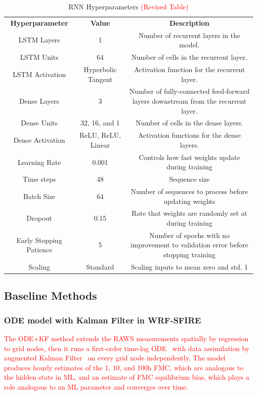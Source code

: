 \documentclass[fire,article,submit,pdftex,moreauthors]{Definitions/mdpi}
\begin{document}
\begin{table}[tbh]
\small
\caption{RNN Hyperparameters \textcolor{red}{(Revised Table)}\label{tab:rnn_params}}
\begin{tabularx}{\textwidth}{CCC}
\toprule
\textbf{Hyperparameter} & \textbf{Value} & \textbf{Description} \\
LSTM Layers & 1 & Number of recurrent layers in the model.\\
\midrule
LSTM Units & 64 & Number of cells in the recurrent layer.\\
\midrule
LSTM Activation & Hyperbolic Tangent & Activation function for the recurrent layer.\\
\midrule
Dense Layers & 3 & Number of fully-connected feed-forward layers downstream from the recurrent layer.\\
\midrule
Dense Units & 32, 16, and 1 & Number of cells in the dense layers.\\
\midrule
Dense Activation & ReLU, ReLU, Linear & Activation functions for the dense layers.\\
\midrule
Learning Rate & 0.001 & Controls how fast weights update during training \\
\midrule
Time steps & 48 & 
Sequence size\\
\midrule
Batch Size & 64 & Number of sequences to process before updating weights \\
\midrule
Dropout & 0.15 & Rate that weights are randomly set at during training \\
\midrule
Early Stopping Patience & 5 & Number of epochs with no improvement to validation error before stopping training \\
\midrule
Scaling & Standard & Scaling inputs to mean zero and std. 1 \\
\bottomrule
\end{tabularx}
\end{table}

\subsection{Baseline Methods}
\label{subsec:baseline}

\subsubsection{ODE model with Kalman Filter in WRF-SFIRE}
\label{sec:ODE_KF}

\textcolor{red}{The ODE+KF method extends the RAWS measurements spatially by regression to grid nodes, then it runs a first-order time-lag ODE~\citep{Mandel-2014-RAA} with data assimilation by augmented Kalman Filter~\citep{Vejmelka-2016-DAD} on every grid node independently. The model produces hourly estimates of the 1, 10, and 100h FMC, which are analogous to the hidden state in ML, and an estimate of FMC equilibrium bias, which plays a role analogous to an ML parameter and converges over time.}
\end{document}
